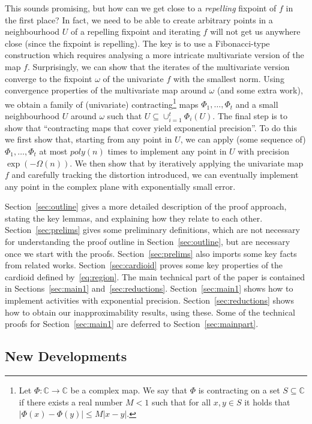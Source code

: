 \documentclass[11pt]{article}
\def\Complex{\mathbb{C}}
\begin{document}
This sounds promising, but how can we get close to a \emph{repelling} fixpoint of $f$ in the first place? In fact, we need to be able to create arbitrary points in a neighbourhood $U$ of a repelling fixpoint and iterating $f$ will not get us anywhere close (since the fixpoint is repelling).  The key is  to use a Fibonacci-type construction which requires analysing a more intricate multivariate version of the map $f$. Surprisingly, we can show that the iterates of the multivariate version converge to the fixpoint $\omega$ of the univariate $f$ with the smallest norm.  Using convergence properties of the multivariate map around $\omega$ (and some extra work), we obtain a family of (univariate) contracting\footnote{Let $\Phi: \Complex\rightarrow \Complex$ be a complex map. We say that $\Phi$ is contracting on a set $S\subseteq \Complex$ if there exists a  real number $M<1$ such that for all $x,y\in S$ it holds that $|\Phi(x)-\Phi(y)|\leq M|x-y|$.}  maps $\Phi_1,\hdots,\Phi_t$ and  a small neighbourhood $U$ around $\omega$ such that $U\subseteq \cup^t_{i=1}\Phi_i(U)$. The final step is to show that ``contracting maps that cover yield exponential precision''. To do this we first show  that, starting from any point in $U$, we can apply (some sequence of) $\Phi_1,\hdots,\Phi_t$ at most $poly(n)$ times to  implement any point in $U$ with precision $\exp(-\Omega(n))$. 
We then show that by iteratively applying  the univariate map $f$ and carefully tracking the distortion introduced, we 
can eventually implement any point in the complex plane with exponentially small error.

Section~\ref{sec:outline} gives a more detailed description of the proof approach, stating the key lemmas, and
explaining how they relate to each other. Section~\ref{sec:prelims} gives some preliminary definitions,
which are not necessary for understanding the proof outline in Section~\ref{sec:outline}, but are necessary once we start with the proofs.
 Section~\ref{sec:prelims} also imports some key facts from related works.
 Section~\ref{sec:cardioid} proves some key properties of the cardioid defined by~\eqref{eq:region}. 
 The main technical part of the paper is contained in Sections~\ref{sec:main1} and~\ref{sec:reductions}.
 Section~\ref{sec:main1} shows how to implement activities with exponential precision.
 Section~\ref{sec:reductions} shows how to obtain our inapproximability results, using these.
 Some of the technical proofs for Section~\ref{sec:main1} are deferred to Section~\ref{sec:mainpart}. 


\subsection{New Developments}
\end{document}
